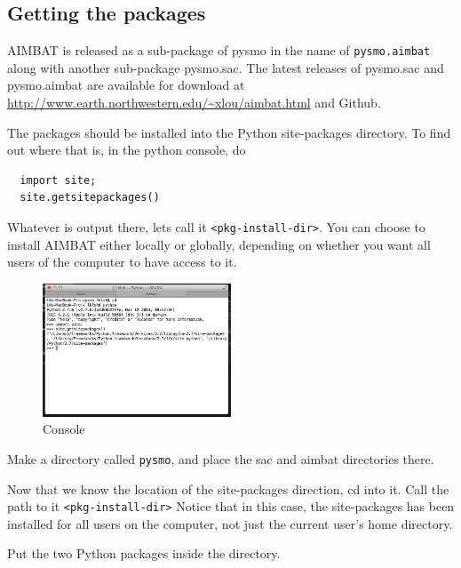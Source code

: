\documentclass[letterpaper,10pt]{article}
\begin{document}

\subsection{Getting the packages}

AIMBAT is released as a sub-package of pysmo in the name of \verb"pysmo.aimbat" along with
another sub-package pysmo.sac. The latest releases of pysmo.sac and pysmo.aimbat are
available for download at \url{http://www.earth.northwestern.edu/~xlou/aimbat.html} and Github. 

The packages should be installed into the Python site-packages directory. To find out where that is, in the python console, do

\begin{verbatim}
  import site;
  site.getsitepackages()
\end{verbatim}

Whatever is output there, lets call it \verb"<pkg-install-dir>". You can choose to install AIMBAT either locally or globally, depending on whether you want all users of the computer to have access to it.

\begin{figure}[h!]
  \centering
  \includegraphics[width=0.5\textwidth]{images/site_package_location}
  \caption{Console}
  \label{fig:site_package_location}
\end{figure}

Make a directory called \verb"pysmo", and place the sac and aimbat directories there. 

Now that we know the location of the site-packages direction, cd into it. Call the path to it \verb"<pkg-install-dir>" Notice that in this case, the site-packages has been installed for all users on the computer, not just the current user's home directory. 

Put the two Python packages inside the directory.

\end{document}
